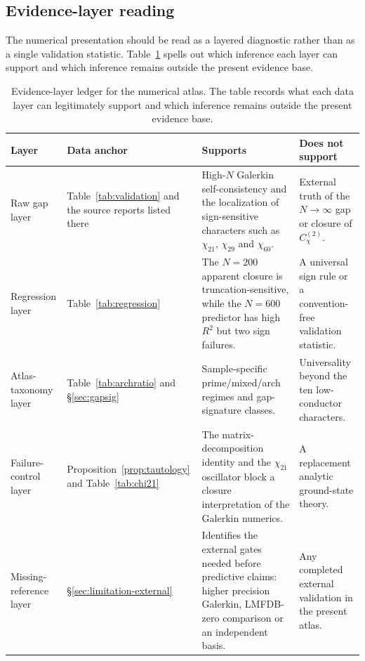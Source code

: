 \documentclass[a4paper,10pt,twocolumn]{article}
\theoremstyle{definition}
\theoremstyle{remark}
\newcommand{\chifn}{\chi}
\begin{document}
\subsection{Evidence-layer reading}
\label{sec:validation-evidence-ledger}

The numerical presentation should be read as a layered diagnostic rather
than as a single validation statistic. Table~\ref{tab:evidence-layer-ledger}
spells out which inference each layer can support and which inference
remains outside the present evidence base.

\begin{table}[t]
\caption{Evidence-layer ledger for the numerical atlas. The table records
  what each data layer can legitimately support and which inference remains
  outside the present evidence base.}
\label{tab:evidence-layer-ledger}
\centering
\footnotesize
\begin{tabular}{@{}p{}p{}p{}p{}@{}}
\toprule
Layer & Data anchor & Supports & Does not support \\
\midrule
Raw gap layer &
Table~\ref{tab:validation} and the source reports listed there &
High-$N$ Galerkin self-consistency and the localization of
sign-sensitive characters such as $\chifn_{21}$, $\chifn_{29}$ and
$\chifn_{60}$. &
External truth of the $N\to\infty$ gap or closure of
$C^{(2)}_{\chifn}$. \\
\addlinespace
Regression layer &
Table~\ref{tab:regression} &
The $N=200$ apparent closure is truncation-sensitive, while the
$N=600$ predictor has high $R^2$ but two sign failures. &
A universal sign rule or a convention-free validation statistic. \\
\addlinespace
Atlas-taxonomy layer &
Table~\ref{tab:archratio} and
\S\ref{sec:gapsig} &
Sample-specific prime/mixed/arch regimes and gap-signature classes. &
Universality beyond the ten low-conductor characters. \\
\addlinespace
Failure-control layer &
Proposition~\ref{prop:tautology} and
Table~\ref{tab:chi21} &
The matrix-decomposition identity and the $\chifn_{21}$ oscillator block
a closure interpretation of the Galerkin numerics. &
A replacement analytic ground-state theory. \\
\addlinespace
Missing-reference layer &
\S\ref{sec:limitation-external} &
Identifies the external gates needed before predictive claims: higher
precision Galerkin, LMFDB-zero comparison or an independent basis. &
Any completed external validation in the present atlas. \\
\bottomrule
\end{tabular}
\end{table}
\end{document}
